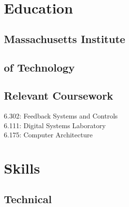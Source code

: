 \documentclass[letterpaper, article]{deedy-resume-openfont}
\begin{document}
\begin{minipage}[t]{0.33\textwidth}

\vspace{\topsep}


\section{Education}

\subsection{Massachusetts Institute \hfill}
\subsection{of Technology \hfill}
\sectionsep

\subsection{Relevant Coursework \hfill}
\vspace{.05cm}
6.302: Feedback Systems and Controls\\
6.111: Digital Systems Laboratory \\
6.175: Computer Architecture



\section{Skills}
\subsection{Technical}


\end{minipage}
\end{document}
